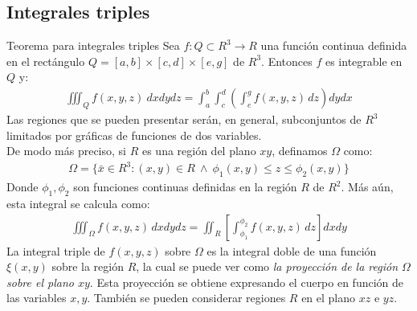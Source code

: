 \documentclass[a4paper, twoside]{article}
\numberwithin{equation}{section}
\numberwithin{figure}{section}
\numberwithin{table}{section}
\begin{document}
\subsection{Integrales triples}
\begin{teorema*}{Teorema para integrales triples}
	Sea $f: Q \subset R^3 \to R$ una función continua definida en el rectángulo $Q=[a,b] \times [c,d] \times [e,g]$ de $R^3$. Entonces $f$ es integrable en $Q$ y:
	\begin{align}
		\iiint_{Q} f(x,y,z)\: dxdydz=\int_{a}^{b}\int_{c}^{d}\left(\int_{e}^{g}f\left(x,y,z\right)\, dz\right)dydx
	\end{align}
	Las regiones que se pueden presentar serán, en general, subconjuntos de $R^3$ limitados por gráficas de funciones de dos variables.\\
	De modo más preciso, si $R$ es una región del plano $xy$, definamos	$\Omega$ como:
	\begin{align}
		\Omega=\{\bar{x}\in R^3:(x,y)\in R\:\wedge\:\phi_{1}(x,y)\leq z\leq\phi_{2}(x,y)\}
	\end{align}
	Donde $\phi_1,\phi_2$ son funciones continuas definidas en la región $R$ de $R^2$. Más aún, esta integral se calcula como:
	\begin{align}
		\iiint_{\Omega}f(x,y,z)\, dxdydz=\iint_{R}\left[\int_{\phi_1}^{\phi_2}f(x,y,z)\, dz\right]dxdy
	\end{align}
	La integral triple de $f(x,y,z)$ sobre $\Omega$ es la integral doble de una función $\xi(x,y)$ sobre la región $R$, la cual se puede ver como \emph{la proyección de la región $\Omega$ sobre el plano $xy$}. Esta proyección se obtiene expresando el cuerpo en función de las variables $x,y$. También se pueden considerar regiones $R$ en el plano $xz$ e $yz$.
\end{teorema*}
\end{document}
